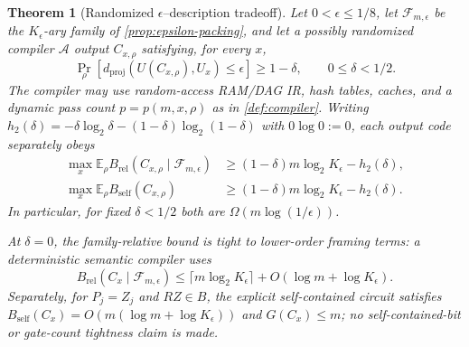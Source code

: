 \documentclass[a4paper,twocolumn,10pt,unpublished]{quantumarticle}
\newtheorem{theorem}{Theorem}
\begin{document}
\begin{theorem}[Randomized $\epsilon$--description tradeoff]
\label{thm:output-counting}
Let $0<\epsilon\leq1/8$, let $\mathcal F_{m,\epsilon}$ be the
$K_\epsilon$-ary family of \cref{prop:epsilon-packing}, and let a possibly
randomized compiler $\mathcal A$ output $C_{x,\rho}$ satisfying, for every
$x$,
\begin{equation}\label{eq:random-success}
 \Pr_\rho\!\left[
 d_{\mathrm{proj}}(U(C_{x,\rho}),U_x)\leq\epsilon
 \right]\geq1-\delta,
 \qquad 0\leq\delta<1/2.
\end{equation}
The compiler may use random-access RAM/DAG IR, hash tables, caches, and a
dynamic pass count $p=p(m,x,\rho)$ as in \cref{def:compiler}.  Writing
$h_2(\delta)=-\delta\log_2\delta-(1-\delta)\log_2(1-\delta)$ with
$0\log 0:=0$, each output
code separately obeys
\begin{equation}\label{eq:output-counting}
\begin{aligned}
 \max_x\mathbb E_\rho
 B_{\mathrm{rel}}(C_{x,\rho}\mid\mathcal F_{m,\epsilon})
 &\geq(1-\delta)m\log_2K_\epsilon-h_2(\delta),\\
 \max_x\mathbb E_\rho B_{\mathrm{self}}(C_{x,\rho})
 &\geq(1-\delta)m\log_2K_\epsilon-h_2(\delta).
\end{aligned}
\end{equation}
In particular, for fixed $\delta<1/2$ both are
$\Omega(m\log(1/\epsilon))$.

At $\delta=0$, the family-relative bound is tight to lower-order framing
terms: a deterministic semantic compiler uses
\begin{equation}\label{eq:relative-epsilon-upper}
 B_{\mathrm{rel}}(C_x\mid\mathcal F_{m,\epsilon})
 \leq\lceil m\log_2K_\epsilon\rceil
       +O(\log m+\log K_\epsilon).
\end{equation}
Separately, for $P_j=Z_j$ and $RZ\in B$, the explicit self-contained
circuit satisfies
$B_{\mathrm{self}}(C_x)=O(m(\log m+\log K_\epsilon))$ and $G(C_x)\leq m$;
no self-contained-bit or gate-count tightness claim is made.
\end{theorem}
\end{document}
